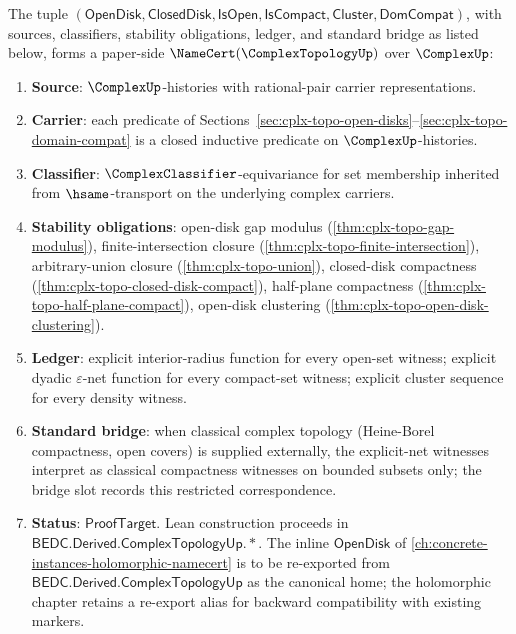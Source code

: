 \begin{theorem}
\label{thm:concrete-cplx-topo-namecert}
The tuple \((\mathsf{OpenDisk}, \mathsf{ClosedDisk}, \mathsf{IsOpen}, \mathsf{IsCompact}, \mathsf{Cluster}, \mathsf{DomCompat})\), with sources, classifiers, stability obligations, ledger, and standard bridge as listed below, forms a paper-side \(\NameCert(\ComplexTopologyUp)\) over \(\ComplexUp\):
\begin{enumerate}
  \item \textbf{Source}: \(\ComplexUp\)-histories with rational-pair carrier representations.
  \item \textbf{Carrier}: each predicate of Sections~\ref{sec:cplx-topo-open-disks}--\ref{sec:cplx-topo-domain-compat} is a closed inductive predicate on \(\ComplexUp\)-histories.
  \item \textbf{Classifier}: \(\ComplexClassifier\)-equivariance for set membership inherited from \(\hsame\)-transport on the underlying complex carriers.
  \item \textbf{Stability obligations}: open-disk gap modulus (\autoref{thm:cplx-topo-gap-modulus}), finite-intersection closure (\autoref{thm:cplx-topo-finite-intersection}), arbitrary-union closure (\autoref{thm:cplx-topo-union}), closed-disk compactness (\autoref{thm:cplx-topo-closed-disk-compact}), half-plane compactness (\autoref{thm:cplx-topo-half-plane-compact}), open-disk clustering (\autoref{thm:cplx-topo-open-disk-clustering}).
  \item \textbf{Ledger}: explicit interior-radius function for every open-set witness; explicit dyadic \(\varepsilon\)-net function for every compact-set witness; explicit cluster sequence for every density witness.
  \item \textbf{Standard bridge}: when classical complex topology (Heine-Borel compactness, open covers) is supplied externally, the explicit-net witnesses interpret as classical compactness witnesses on bounded subsets only; the bridge slot records this restricted correspondence.
  \item \textbf{Status}: \(\mathsf{ProofTarget}\). Lean construction proceeds in \(\mathsf{BEDC.Derived.ComplexTopologyUp.*}\). The inline \(\mathsf{OpenDisk}\) of \autoref{ch:concrete-instances-holomorphic-namecert} is to be re-exported from \(\mathsf{BEDC.Derived.ComplexTopologyUp}\) as the canonical home; the holomorphic chapter retains a re-export alias for backward compatibility with existing markers.
\end{enumerate}
\end{theorem}
